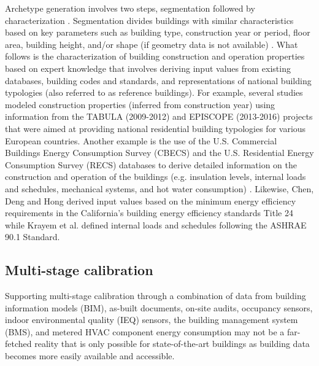 \documentclass[review]{elsarticle}
\begin{document}
Archetype generation involves two steps, segmentation followed by characterization \cite{reinhart2016urban}. Segmentation divides buildings with similar characteristics based on key parameters such as building type, construction year or period, floor area, building height, and/or shape (if geometry data is not available) \cite{sokol2017validation, fernandez2020novel, kristensen2020long, tardioli2020methodology}. What follows is the characterization of building construction and operation properties based on expert knowledge that involves deriving input values from existing databases, building codes and standards, and representations of national building typologies (also referred to as reference buildings). For example, several studies \cite{kristensen2020long, hedegaard2019bottom, wang2020bayesian} modeled construction properties (inferred from construction year) using information from the TABULA (2009-2012) and EPISCOPE (2013-2016) projects \cite{ballarini2014use,loga2016tabula} that were aimed at providing national residential building typologies for various European countries. Another example is the use of the U.S. Commercial Buildings Energy Consumption Survey (CBECS) and the U.S. Residential Energy Consumption Survey (RECS) databases to derive detailed information on the construction and operation of the buildings (e.g. insulation levels, internal loads and schedules, mechanical systems, and hot water consumption) \cite{taylor2019multi, sokol2017validation}. Likewise, Chen, Deng and Hong \cite{chen2020automatic} derived input values based on the minimum energy efficiency requirements in the California's building energy efficiency standards Title 24 while Krayem et al. \cite{krayem2019urban} defined internal loads and schedules following the ASHRAE 90.1 Standard.

\subsection{Multi-stage calibration} \label{sec:multi-stage}

Supporting multi-stage calibration through a combination of data from building information models (BIM), as-built documents, on-site audits, occupancy sensors, indoor environmental quality (IEQ) sensors, the building management system (BMS), and metered HVAC component energy consumption may not be a far-fetched reality that is only possible for state-of-the-art buildings as building data becomes more easily available and accessible.
\end{document}
